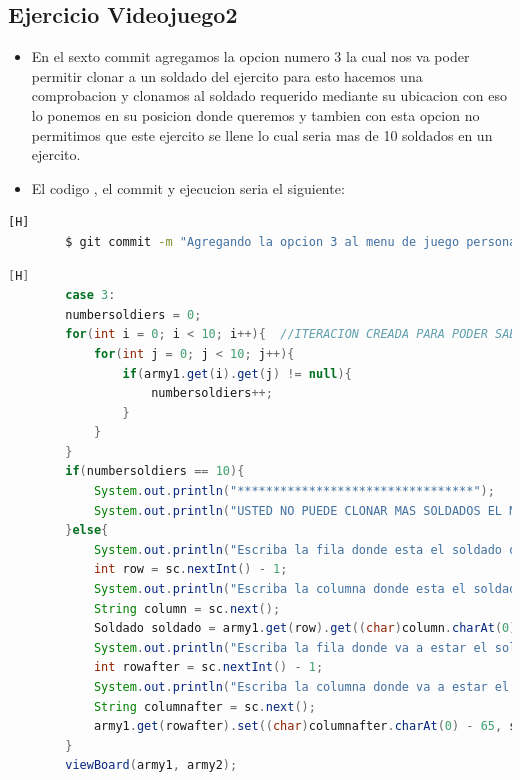 \documentclass{article}
\begin{document}
	\subsection{Ejercicio Videojuego2}
	\begin{itemize}	
		\item En el sexto commit agregamos la opcion numero 3 la cual nos va poder permitir clonar a un soldado del ejercito para esto hacemos una comprobacion y clonamos al soldado requerido mediante su ubicacion con eso lo ponemos en su posicion donde queremos y tambien con esta opcion no permitimos que este ejercito se llene lo cual seria mas de 10 soldados en un ejercito.
		\item El codigo , el commit y ejecucion seria el siguiente:
	\end{itemize}	
	\begin{lstlisting}[language=bash,caption={Commit}][H]
		$ git commit -m "Agregando la opcion 3 al menu de juego personalizado el cual vamos a tener que comprobar que no sobrepase el numero de soldados que es 10 para poder clonar y ver en el tablero para esto hacemos condiciones y buscamos posiciones de los soldados"
	\end{lstlisting}	
	\begin{lstlisting}[language=java,caption={Las lineas de codigos del metodo creado:}][H]
		case 3:
		numbersoldiers = 0;
		for(int i = 0; i < 10; i++){  //ITERACION CREADA PARA PODER SABER QUE SI ESTE BANDO DEL EJERCITO TIENE SOLDADOS PARA PODER JUGAR SI TIENE 10 ESTA OPCION ESTA CANCELADA
			for(int j = 0; j < 10; j++){
				if(army1.get(i).get(j) != null){
					numbersoldiers++;
				}
			}
		}
		if(numbersoldiers == 10){
			System.out.println("*********************************");
			System.out.println("USTED NO PUEDE CLONAR MAS SOLDADOS EL MAXIMO ES 10 SOLDADOS POR EJERCITO");
		}else{
			System.out.println("Escriba la fila donde esta el soldado que quiere clonar:");
			int row = sc.nextInt() - 1;
			System.out.println("Escriba la columna donde esta el soldado que quiere clonar:");
			String column = sc.next();
			Soldado soldado = army1.get(row).get((char)column.charAt(0) - 65);
			System.out.println("Escriba la fila donde va a estar el soldado que quiere clonar:");
			int rowafter = sc.nextInt() - 1;
			System.out.println("Escriba la columna donde va a estar el soldado que quiere clonar:");
			String columnafter = sc.next();
			army1.get(rowafter).set((char)columnafter.charAt(0) - 65, soldado);
		}
		viewBoard(army1, army2);
	\end{lstlisting}
\end{document}

